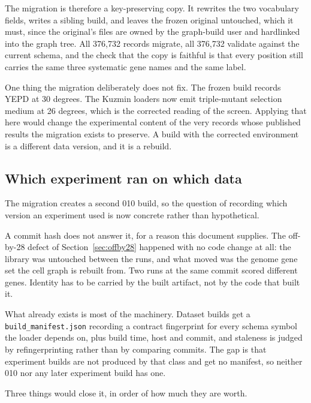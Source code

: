 The migration is therefore a key-preserving copy. It rewrites the two vocabulary
fields, writes a sibling build, and leaves the frozen original untouched, which
it must, since the original's files are owned by the graph-build user and
hardlinked into the graph tree. All 376{,}732 records migrate, all 376{,}732
validate against the current schema, and the check that the copy is faithful is
that every position still carries the same three systematic gene names and the
same label.

One thing the migration deliberately does not fix. The frozen build records YEPD
at 30 degrees. The Kuzmin loaders now emit triple-mutant selection medium at 26
degrees, which is the corrected reading of the screen. Applying that here would
change the experimental content of the very records whose published results the
migration exists to preserve. A build with the corrected environment is a
different data version, and it is a rebuild.

\subsection{Which experiment ran on which data}
\label{sec:versioning}

The migration creates a second 010 build, so the question of recording which
version an experiment used is now concrete rather than hypothetical.

A commit hash does not answer it, for a reason this document supplies. The
off-by-28 defect of Section~\ref{sec:offby28} happened with no code change at
all: the library was untouched between the runs, and what moved was the genome
gene set the cell graph is rebuilt from. Two runs at the same commit scored
different genes. Identity has to be carried by the built artifact, not by the
code that built it.

What already exists is most of the machinery. Dataset builds get a
\texttt{build\_manifest.json} recording a contract fingerprint for every schema
symbol the loader depends on, plus build time, host and commit, and staleness is
judged by refingerprinting rather than by comparing commits. The gap is that
experiment builds are not produced by that class and get no manifest, so neither
010 nor any later experiment build has one.

Three things would close it, in order of how much they are worth.


